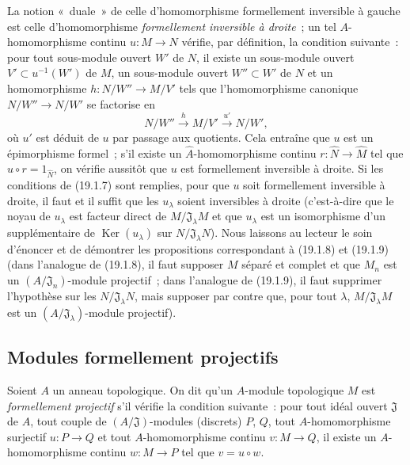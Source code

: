 \begin{remark}[19.1.15]
\label{0.19.1.15-fr}
La notion «~duale~» de celle d'homomorphisme formellement inversible à gauche
est celle d'homomorphisme \emph{formellement inversible à droite}~; un tel
$A$-homomorphisme continu $u:M\to N$ vérifie, par définition, la condition
suivante~: pour tout sous-module ouvert $W'$ de $N$, il existe un sous-module
ouvert $V'\subset u^{-1}(W')$ de $M$, un sous-module ouvert $W''\subset W'$ de
$N$ et un homomorphisme $h:N/W''\to M/V'$ tels que l'homomorphisme canonique
$N/W''\to N/W'$ se factorise en
\[
  N/W''\xrightarrow{h}M/V'\xrightarrow{u'}N/W',
\]
où $u'$ est déduit de $u$ par passage aux quotients. Cela entraîne que $u$ est
un épimorphisme formel~; s'il existe un $\widehat A$-homomorphisme continu
$r:\widehat N\to\widehat M$ tel que $\widehat u\circ r=1_{\widehat N}$, on
vérifie aussitôt que $u$ est formellement inversible à droite. Si les
conditions de (19.1.7) sont remplies, pour que $u$ soit formellement inversible
à droite, il faut et il suffit que les $u_\lambda$ soient inversibles à droite
(c'est-à-dire que le noyau de $u_\lambda$ est facteur direct de
$M/\mathfrak J_\lambda M$ et que $u_\lambda$ est un isomorphisme d'un
supplémentaire de $\operatorname{Ker}(u_\lambda)$ sur
$N/\mathfrak J_\lambda N$). Nous laissons au lecteur le soin d'énoncer et de
démontrer les propositions correspondant à (19.1.8) et (19.1.9) (dans
l'analogue de (19.1.8), il faut supposer $M$ séparé et complet et que $M_n$ est
un $(A/\mathfrak J_n)$-module projectif~; dans l'analogue de (19.1.9), il faut
supprimer l'hypothèse sur les $N/\mathfrak J_\lambda N$, mais supposer par
contre que, pour tout $\lambda$, $M/\mathfrak J_\lambda M$ est un
$(A/\mathfrak J_\lambda)$-module projectif).
\end{remark}

\subsection{Modules formellement projectifs}
\label{subsection:0.19.2-fr}

\begin{definition}[19.2.1]
\label{0.19.2.1-fr}
Soient $A$ un anneau topologique. On dit qu'un $A$-module topologique $M$ est
\emph{formellement projectif} s'il vérifie la condition suivante~: pour tout
idéal ouvert $\mathfrak J$ de $A$, tout couple de $(A/\mathfrak J)$-modules
(discrets) $P$, $Q$, tout $A$-homomorphisme surjectif $u:P\to Q$ et tout
$A$-homomorphisme continu $v:M\to Q$, il existe un $A$-homomorphisme continu
$w:M\to P$ tel que $v=u\circ w$.
\end{definition}

